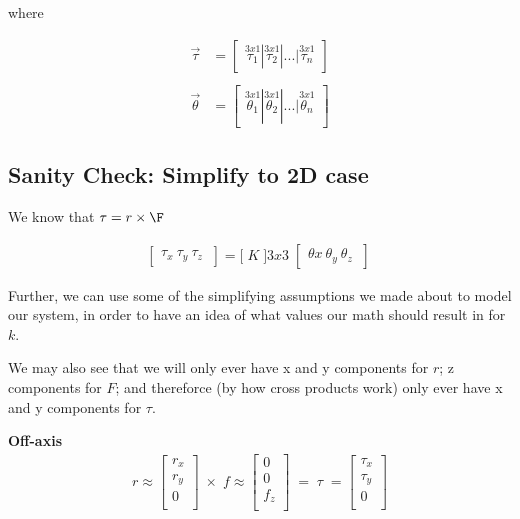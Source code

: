\documentclass[12pt]{article}
\begin{document}
where

\begin{align}
\vec{\tau} &= \begin{bmatrix} \stackrel{3x1}{\tau_1} | \stackrel{3x1}{\tau_2} | ... |\stackrel{3x1}{\tau_n} \end{bmatrix} \\
\\
\vec{\theta} &= \begin{bmatrix} \stackrel{3x1}{\theta_1} | \stackrel{3x1}{\theta_2} | ... |\stackrel{3x1}{\theta_n} \end{bmatrix}
\end{align}

\subsection{Sanity Check: Simplify to 2D case}

We know that $\tau=r\times\F$


\begin{align}
    \begin{bmatrix}
        \tau_{x} \
        \tau_{y} \
        \tau_{z} \
    \end{bmatrix} =
    \Bigg[ \; K \; \Bigg]{3x3} \;
    \begin{bmatrix}
        \theta{x} \
        \theta_{y} \
        \theta_{z} \
    \end{bmatrix} \
\end{align}

Further, we can use some of the simplifying assumptions we made about to model our system, in order to have an idea of what values our math should result in for $k$.

We may also see that we will only ever have x and y components for $r$; z components for $F$; and thereforce (by how cross products work) only ever have x and y components for $\tau$.

\textbf{Off-axis}
\begin{align}
r \approx
\begin{bmatrix}
    r_x       \\
    r_y       \\
    0       \\
\end{bmatrix} \; \times \;
f \approx
\begin{bmatrix}
    0       \\
    0       \\
    f_z      \\
\end{bmatrix} \; =  \; \tau \; = 
\begin{bmatrix}
    \tau_x       \\
    \tau_y       \\
    0      \\
\end{bmatrix}\\
\end{align}
\end{document}
